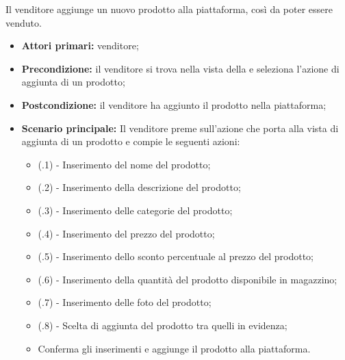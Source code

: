 
Il venditore aggiunge un nuovo prodotto alla piattaforma, così da poter essere venduto.
\begin{itemize}
    \item \textbf{Attori primari:} venditore;
    \item \textbf{Precondizione:} il venditore si trova nella vista della  e seleziona l'azione di aggiunta di un prodotto;
    \item \textbf{Postcondizione:} il venditore ha aggiunto il prodotto nella piattaforma;
    \item \textbf{Scenario principale:} Il venditore preme sull'azione che porta alla vista di aggiunta di un prodotto e compie le seguenti azioni:
    \begin{itemize}
        \item (\actualUC.1) - Inserimento del nome del prodotto;
        \item (\actualUC.2) - Inserimento della descrizione del prodotto;
        \item (\actualUC.3) - Inserimento delle categorie del prodotto;
        \item (\actualUC.4) - Inserimento del prezzo del prodotto;
        \item (\actualUC.5) - Inserimento dello sconto percentuale al prezzo del prodotto;
        \item (\actualUC.6) - Inserimento della quantità del prodotto disponibile in magazzino;
        \item (\actualUC.7) - Inserimento delle foto del prodotto;
        \item (\actualUC.8) - Scelta di aggiunta del prodotto tra quelli in evidenza;
        \item Conferma gli inserimenti e aggiunge il prodotto alla piattaforma.
    \end{itemize}
\end{itemize}

